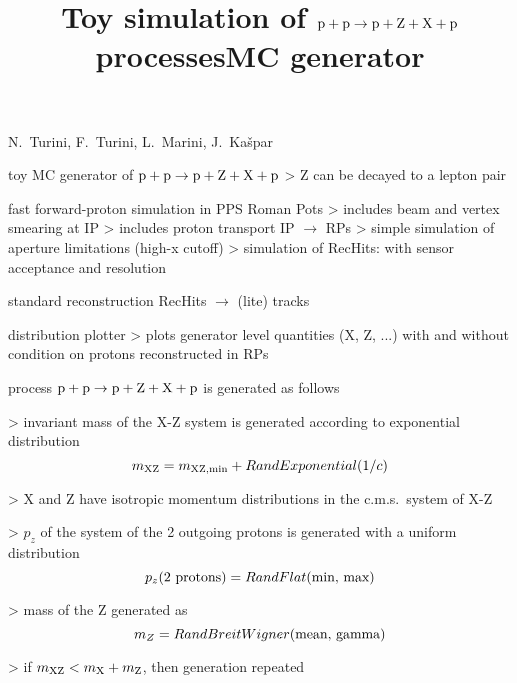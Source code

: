


\newpage %

\def\author{PPS}
\def\caption{PPXZ generator}
\def\date{24 Oct 2018}

\newpage %
\hbox{}
\vfil
\title{Toy simulation of $\rm p + p \rightarrow p + Z + X + p$ processes}
\vskip3mm
\centerline{N.~Turini, F.~Turini, L.~Marini, J.~Ka\v spar}
\vfil


\newpage %

\> toy MC generator of $\rm p + p \rightarrow p + Z + X + p$
\>> Z can be decayed to a lepton pair

\> fast forward-proton simulation in PPS Roman Pots
\>> includes beam and vertex smearing at IP
\>> includes proton transport IP $\rightarrow$ RPs
\>> simple simulation of aperture limitations (high-x cutoff)
\>> simulation of RecHits: with sensor acceptance and resolution

\> standard reconstruction RecHits $\rightarrow$ (lite) tracks

\> distribution plotter
\>> plots generator level quantities (X, Z, ...) with and without condition on protons reconstructed in RPs



\newpage %
\title{MC generator}

\> process $\rm p + p \rightarrow p + Z + X + p$ is generated as follows

\>> invariant mass of the X-Z system is generated according to exponential distribution
\vskip-3mm
\cThird
$$m_{\rm XZ} = m_{\rm XZ,min} + RandExponential(1/c)$$
\vskip2mm

\>> X and Z have isotropic momentum distributions in the c.m.s.~system of X-Z

\>> $p_z$ of the system of the 2 outgoing protons is generated with a uniform distribution
\cThird
\vskip-2mm
$$p_z(\hbox{2 protons}) = RandFlat(\hbox{min, max})$$
\vskip2mm

\>> mass of the Z generated as
\cThird
\vskip-2mm
$$m_Z = RandBreitWigner(\hbox{mean, gamma})$$
\vskip2mm

\>> if $m_{\rm XZ} < m_{\rm X} + m_{\rm Z}$, then generation repeated


